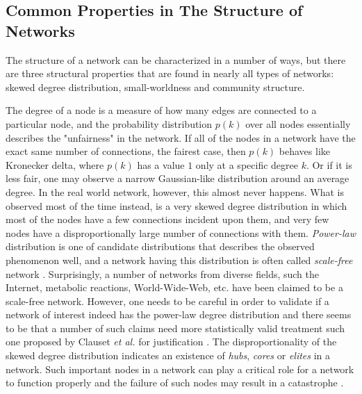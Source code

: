 \documentclass{article}
\begin{document}
	\subsection{Common Properties in The Structure of Networks}
	The structure of a network can be characterized in a number of ways, but there are three structural properties that are found in nearly all types of networks: skewed degree distribution, small-worldness and community structure.
	
	 The degree of a node is a measure of how many edges are connected to a particular node, and the probability distribution $p(k)$ over all nodes essentially describes the "unfairness" in the network. If all of the nodes in a network have the exact same number of connections, the fairest case, then $p(k)$ behaves like Kronecker delta, where $p(k)$ has a value $1$ only at a specific degree $k$. Or if it is less fair, one may observe a narrow Gaussian-like distribution around an average degree. In the real world network, however, this almost never happens. What is observed most of the time instead, is a very skewed degree distribution in which most of the nodes have a few connections incident upon them, and very few nodes have a disproportionally large number of connections with them. \textit{Power-law} distribution is one of candidate distributions that describes the observed phenomenon well, and a network having this distribution is often called \textit{scale-free} network \cite{Barabasi99emergenceScaling}. Surprisingly, a number of networks  from diverse fields, such the Internet, metabolic reactions, World-Wide-Web, etc. have been claimed to be a scale-free network. However, one needs to be careful in order to validate if a network of interest indeed has the power-law degree distribution and there seems to be that a number of such claims need more statistically valid treatment such one proposed by Clauset \textit{et al.} for justification \cite{Clauset:PowerLaw}. The disproportionality of the skewed degree distribution indicates an existence of  \textit{hubs}, \textit{cores} or \textit{elites} in a network. Such important nodes in a network can play a critical role for a network to function properly and the failure of such nodes may result in a catastrophe \cite{ScaleFreeAttack}.
	
\end{document}
